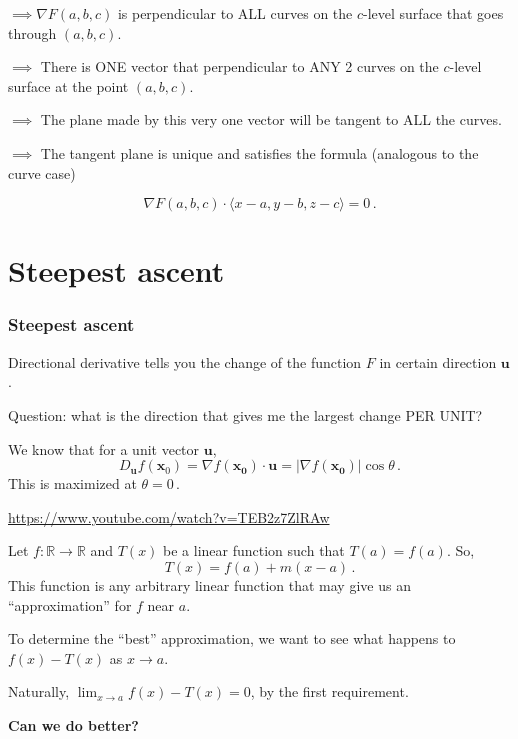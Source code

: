 \documentclass[aspectratio=169]{beamer}
\newcommand{\vect}{\mathbf}
\newcommand{\R}{\mathbb{R}}
\begin{document}
\begin{frame}
    $\implies \nabla F(a,b,c)$ is perpendicular to ALL curves on the $c$-level surface
    that goes through $(a,b,c)$. \pause

    $\implies$ There is ONE vector that perpendicular to ANY 2 curves on the $c$-level surface at the point $(a,b,c)$. \pause

    $\implies$ The plane made by this very one vector will be tangent to ALL the curves. \pause

    $\implies$ The tangent plane is unique  and satisfies the formula (analogous to the
    curve case)

    \begin{equation*}
        \nabla F(a,b,c) \cdot \langle x-a, y-b, z-c \rangle = 0 \,.
    \end{equation*}

\end{frame}

\section{Steepest ascent}

\begin{frame}
    \frametitle{ Steepest ascent}
    Directional derivative tells you the change of the function $F$ in certain direction $\vect{u}$.

    Question: what is the direction that gives me the largest change PER UNIT? \pause

    We know that for a unit vector $\vect{u}$,
    \begin{equation*}
        D_{\vect{u}} f (\vect{x}_0) = \nabla f(\vect{x_0}) \cdot \vect{u} = | \nabla f(\vect{x_0})| \cos\theta \,.
    \end{equation*}
    \pause
    This is maximized at $\theta = 0$\,.

    \url{https://www.youtube.com/watch?v=TEB2z7ZlRAw}
\end{frame}

\begin{frame}
    Let $f: \R \to \R$
    and $T(x)$ be a linear function such that $T(a) = f(a)$.
    So, 
    \begin{equation*}
        T(x) = f(a) + m(x-a) \,.
    \end{equation*}
    This function is any arbitrary linear function that may give us an ``approximation''
    for $f$ near $a$. \pause

    To determine the ``best'' approximation, we want to see what happens to
    $f(x) - T(x)$ as $x\to a$. \pause

    Naturally, $\lim_{x\to a} f(x) - T(x) = 0$, by the first requirement. \pause

    \textbf{Can we do better?}
\end{frame}
\end{document}
